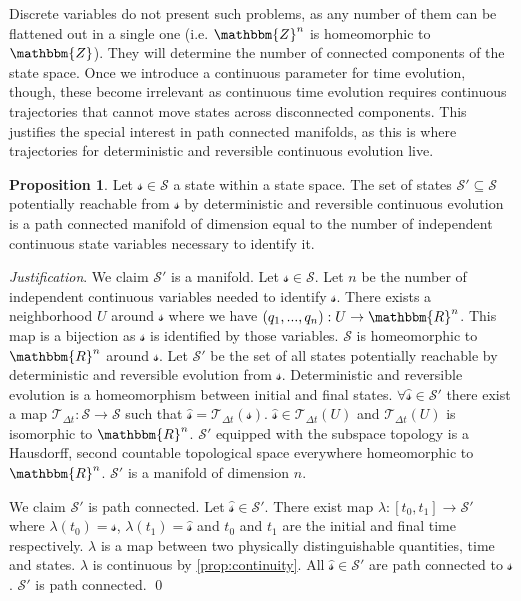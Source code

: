 \documentclass[aps,pra,10pt,twocolumn,floatfix,nofootinbib]{revtex4-1}
\numberwithin{equation}{section}
\theoremstyle{definition}
\newtheorem{prop}[equation]{Proposition}
\newenvironment{justification}{\emph{Justification}.}{\qed}
\begin{document}
Discrete variables do not present such problems, as any number of them can be flattened out in a single one (i.e. $\mathbbm{Z}^n$ is homeomorphic to $\mathbbm{Z}$). They will determine the number of connected components of the state space. Once we introduce a continuous parameter for time evolution, though, these become irrelevant as continuous time evolution requires continuous trajectories that cannot move states across disconnected components. This justifies the special interest in path connected manifolds, as this is where trajectories for deterministic and reversible continuous evolution live.

\begin{prop}\label{prop:manifold}
	Let $\mathcal{s} \in \mathcal{S}$ a state within a state space. The set of states $\mathcal{S}'\subseteq\mathcal{S}$ potentially reachable from $\mathcal{s}$ by deterministic and reversible continuous evolution is a path connected manifold of dimension equal to the number of independent continuous state variables necessary to identify it.
\end{prop}

\begin{justification}
	We claim $\mathcal{S}'$ is a manifold. Let $\mathcal{s} \in \mathcal{S}$. Let $n$ be the number of independent continuous variables needed to identify $\mathcal{s}$. There exists a neighborhood $U$ around $\mathcal{s}$ where we have $(q_1,...,q_n):U\rightarrow \mathbbm{R}^n$. This map is a bijection as $\mathcal{s}$ is identified by those variables. $\mathcal{S}$ is homeomorphic to $\mathbbm{R}^n$ around  $\mathcal{s}$. Let $\mathcal{S}'$ be the set of all states potentially reachable by deterministic and reversible evolution from $\mathcal{s}$. Deterministic and reversible evolution is a homeomorphism between initial and final states. $\forall \hat{\mathcal{s}} \in \mathcal{S}'$ there exist a map $\mathcal{T}_{\Delta t}:\mathcal{S} \rightarrow \mathcal{S}$ such that $\hat{\mathcal{s}} =\mathcal{T}_{\Delta t}(\mathcal{s})$. $\hat{\mathcal{s}} \in \mathcal{T}_{\Delta t}(U)$ and $\mathcal{T}_{\Delta t}(U)$ is isomorphic to $\mathbbm{R}^n$. $\mathcal{S}'$ equipped with the subspace topology is a Hausdorff, second countable topological space everywhere homeomorphic to $\mathbbm{R}^n$. $\mathcal{S}'$ is a manifold of dimension $n$.
	
	We claim $\mathcal{S}'$ is path connected. Let $\hat{\mathcal{s}} \in \mathcal{S}'$. There exist map $\lambda : [t_0,t_1] \rightarrow \mathcal{S}'$ where $\lambda(t_0)=\mathcal{s}$, $\lambda(t_1)=\hat{\mathcal{s}}$ and $t_0$ and $t_1$ are the initial and final time respectively. $\lambda$ is a map between two physically distinguishable quantities, time and states. $\lambda$ is continuous by \ref{prop:continuity}. All $\hat{\mathcal{s}} \in \mathcal{S}'$ are path connected to $\mathcal{s}$. $\mathcal{S}'$ is path connected.
\end{justification}
\end{document}
